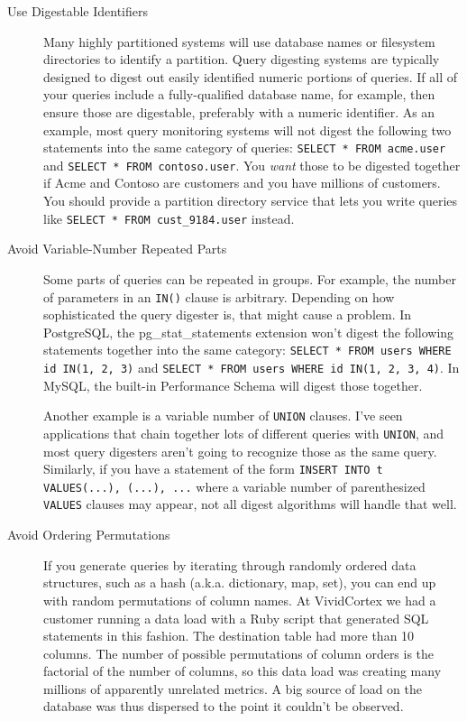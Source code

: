 \documentclass{vivid_layout}
\begin{document}
\begin{description}

\item[Use Digestable Identifiers] Many highly partitioned systems will use
database names or filesystem directories to identify a partition. Query
digesting systems are typically designed to digest out easily identified numeric
portions of queries. If all of your queries include a fully-qualified database
name, for example, then ensure those are digestable, preferably with a numeric
identifier. As an example, most query monitoring systems will not digest the
following two statements into the same category of queries: \texttt{SELECT *
FROM acme.user} and \texttt{SELECT * FROM contoso.user}. You \emph{want}
those to be digested together if Acme and Contoso are customers and you
have millions of customers. You should provide a partition directory service
that lets you write queries like \texttt{SELECT * FROM cust\_9184.user} instead.

\item[Avoid Variable-Number Repeated Parts] Some parts of queries can be
repeated in groups. For example, the number of parameters in an \texttt{IN()}
clause is arbitrary. Depending on how sophisticated the query digester is, that
might cause a problem. In PostgreSQL, the pg\_stat\_statements extension won't
digest the following statements together into the same category: 
\texttt{SELECT * FROM users WHERE id IN(1, 2, 3)} and
\texttt{SELECT * FROM users WHERE id IN(1, 2, 3, 4)}. In MySQL, the built-in
Performance Schema will digest those together.

Another example is a variable number of \texttt{UNION} clauses. I've seen
applications that chain together lots of different queries with \texttt{UNION},
and most query digesters aren't going to recognize those as the same query.
Similarly, if you have a statement of the form \texttt{INSERT INTO t
VALUES(...), (...), ...} where a variable number of parenthesized
\texttt{VALUES} clauses may appear, not all digest algorithms will handle that
well.

\item[Avoid Ordering Permutations] If you generate queries by iterating through
randomly ordered data structures, such as a hash (a.k.a. dictionary, map, set),
you can end up with random permutations of column names. At VividCortex we had a
customer running a data load with a Ruby script that generated SQL statements in
this fashion. The destination table had more than 10 columns. The number of
possible permutations of column orders is the factorial of the number of
columns, so this data load was creating many millions of apparently unrelated
metrics. A big source of load on the database was thus dispersed to the point it
couldn't be observed.


\end{description}
\end{document}
